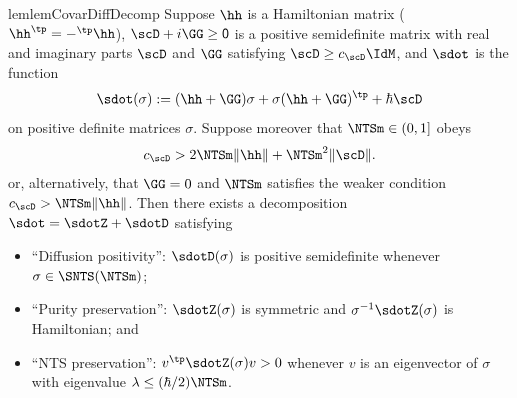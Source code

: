 \documentclass{article}
\numberwithin{equation}{section}
\begin{document}
\begin{restatable}{lem}{lemCovarDiffDecomp}
\label{lem:covar-diff-decomp}
Suppose $\hh$ is a Hamiltonian matrix ($\hh^\tp = -\sf^\tp \hh \sf$), $\scD + i\GG\sf \ge 0$ is a positive semidefinite matrix with real and imaginary parts $\scD$ and $\GG\sf$ satisfying $\scD \ge c_{\scD} \IdM$, and $\sdot$ is the function
\begin{equation}
	\label{eq:covar-diff-decomp-s}
    \sdot(\sigma) := (\hh+\GG)\sigma + \sigma(\hh+\GG)^\tp + \hbar\scD
\end{equation}
on positive definite matrices $\sigma$.
Suppose moreover that $\NTSm \in (0,1]$ obeys 
\begin{align}
    \label{eq:NTSl-constraint}
    c_{\scD} > 2\NTSm \|\hh\| + \NTSm^2 \|\scD\|. 
\end{align}
or, alternatively, that $\GG=0$ and $\NTSm$ satisfies the weaker condition $c_{\scD} > \NTSm \|\hh\|$. 
Then there exists a decomposition 
$\sdot=\sdotZ+\sdotD$ 
satisfying
\begin{itemize} 
\item ``Diffusion positivity'': $\sdotD(\sigma)$ is positive semidefinite whenever $\sigma \in \SNTS(\NTSm)$; 
\item ``Purity preservation'': $\sdotZ(\sigma)$ is symmetric and $\sigma^{-1}\sdotZ(\sigma)$ is Hamiltonian; and 
\item ``NTS preservation'': 
$v^\tp \sdotZ(\sigma)v > 0$ 
whenever $v$ is an eigenvector of $\sigma$ 
with eigenvalue $ \lambda \leq (\hbar/2)\NTSm$.
\end{itemize}
\end{restatable}
\end{document}
